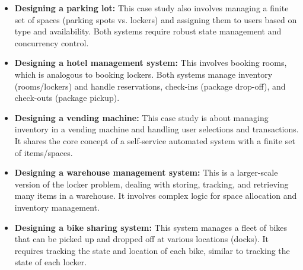 \begin{itemize}
\item
\textbf{Designing a parking lot:} This case study also involves managing a finite set of spaces (parking spots vs. lockers) and assigning them to users based on type and availability. Both systems require robust state management and concurrency control.
\item
\textbf{Designing a hotel management system:} This involves booking rooms, which is analogous to booking lockers. Both systems manage inventory (rooms/lockers) and handle reservations, check-ins (package drop-off), and check-outs (package pickup).
\item
\textbf{Designing a vending machine:} This case study is about managing inventory in a vending machine and handling user selections and transactions. It shares the core concept of a self-service automated system with a finite set of items/spaces.
\item
\textbf{Designing a warehouse management system:} This is a larger-scale version of the locker problem, dealing with storing, tracking, and retrieving many items in a warehouse. It involves complex logic for space allocation and inventory management.
\item
\protect{}\label{6c3HOI-MfsNUrsA3PDgaL}
\textbf{Designing a bike sharing system:} This system manages a fleet of bikes that can be picked up and dropped off at various locations (docks). It requires tracking the state and location of each bike, similar to tracking the state of each locker.
\end{itemize}

